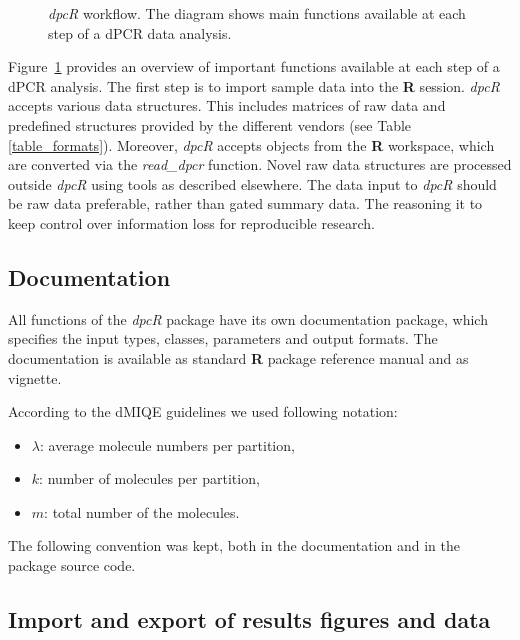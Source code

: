 \documentclass[a4,center,fleqn]{NAR}
\begin{document}
\begin{figure}[t]
\begin{center}
\end{center}
\caption{\textit{dpcR} workflow. The diagram shows main functions 
available at each step of a dPCR data analysis.}
\label{workflow}
\end{figure}

Figure~\ref{workflow} provides an overview of important functions available at 
each step of a dPCR analysis. The first step is to import sample data into the 
\textbf{R} session. \textit{dpcR} accepts various data structures. This 
includes 
matrices of raw data and predefined structures provided by the different 
vendors 
(see Table \ref{table_formats}). Moreover, \textit{dpcR} accepts objects from 
the \textbf{R} workspace, which are converted via the \textit{read\_dpcr} 
function. Novel raw data structures are processed outside \textit{dpcR} using 
tools as described elsewhere. The data input to \textit{dpcR} should be raw 
data 
preferable, rather than gated summary data. The reasoning it to keep control 
over information loss for reproducible research.

\subsection{Documentation}

All functions of the \textit{dpcR} package have its own documentation package, 
which specifies the input types, classes, parameters and output formats. The 
documentation is available as standard \textbf{R} package reference manual and 
as vignette.

According to the dMIQE guidelines \cite{huggett_digital_2013} we used following 
notation:
\begin{itemize}
 \item $\lambda$: average molecule numbers per partition,
 \item $k$: number of molecules per partition,
 \item $m$: total number of the molecules.
\end{itemize}

The following convention was kept, both in the documentation and in the 
package source code.

\subsection{Import and export of results figures and data}
\end{document}
